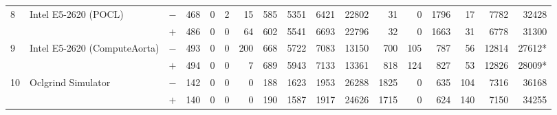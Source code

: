 \begin{tabular}{lll | rrrrrrr | rrrrrrr }
\hline
\multirow{ 2}{*}{8} & \multirow{ 2}{*}{Intel E5-2620 (POCL)} & $-$ & 468 & 0 & 2 & 15 & 585 & 5351 & 6421       & 22802 & 31 & 0 & 1796 & 17 & 7782 & 32428 \\& & $+$ & 486 & 0 & 0 & 64 & 602 & 5541 & 6693 & 22796 & 32 & 0 & 1663 & 31 & 6778 & 31300 \\
\hline
\multirow{ 2}{*}{9} & \multirow{ 2}{*}{Intel E5-2620 (ComputeAorta)} & $-$ & 493 & 0 & 0 & 200 & 668 & 5722 & 7083       & 13150 & 700 & 105 & 787 & 56 & 12814 & 27612* \\& & $+$ & 494 & 0 & 0 & 7 & 689 & 5943 & 7133 & 13361 & 818 & 124 & 827 & 53 & 12826 & 28009* \\
\hline
\multirow{ 2}{*}{10} & \multirow{ 2}{*}{Oclgrind Simulator} & $-$ & 142 & 0 & 0 & 0 & 188 & 1623 & 1953       & 26288 & 1825 & 0 & 635 & 104 & 7316 & 36168 \\& & $+$ & 140 & 0 & 0 & 0 & 190 & 1587 & 1917 & 24626 & 1715 & 0 & 624 & 140 & 7150 & 34255 \\
  \bottomrule
\end{tabular}

